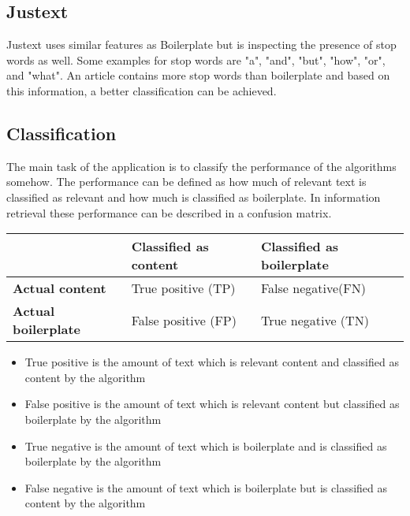 \subsection{Justext}

Justext uses similar features as Boilerplate but is inspecting the presence of stop words as well. Some examples for stop words are "a", "and", "but", "how", "or", and "what". An article contains more stop words than boilerplate and based on this information, a better classification can be achieved.

\subsection{Classification}

The main task of the application is to classify the performance of the algorithms somehow. The performance can be defined as how much of relevant text is classified as relevant and how much is classified as boilerplate. In information retrieval these performance can be described in a confusion matrix.

\begin{table}[h]
\begin{tabular}{|p{4cm} |p{5.5cm} |p{5.5cm} |}\hline
          								& \textbf{Classified as content} 	& \textbf{Classified as boilerplate} 	\\ \hline
\textbf{Actual content} 				& True positive (TP)				& False negative(FN)					\\ \hline
\textbf{Actual boilerplate} 			& False positive (FP)       		& True negative (TN)				 	\\ \hline
\end{tabular}
\end{table}

\begin{itemize}
\item True positive is the amount of text which is relevant content and classified as content by the algorithm
\item False positive is the amount of text which is relevant content but classified as boilerplate by the algorithm 
\item True negative is the amount of text which is boilerplate and is classified as boilerplate by the algorithm
\item False negative is the amount of text which is boilerplate but is classified as content by the algorithm
\end{itemize}


